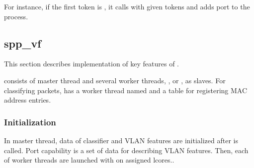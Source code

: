 \documentclass[a4paper,11pt,openany,oneside,english]{sphinxmanual}
\begin{document}
For instance, if the first token is , it calls  with
given tokens and adds port to the process.


\subsection{spp\_vf}
\label{\detokenize{design/impl/spp_vf:spp-vf}}\label{\detokenize{design/impl/spp_vf:spp-vf-explain-spp-vf}}\label{\detokenize{design/impl/spp_vf::doc}}
This section describes implementation of key features of .

 consists of master thread and several worker threads,
,  or , as slaves.
For classifying packets,  has a worker thread named 
and a table for registering MAC address entries.


\subsubsection{Initialization}
\label{\detokenize{design/impl/spp_vf:initialization}}
In master thread, data of classifier and VLAN features are initialized
after  is called.
Port capability is a set of data for describing VLAN features.
Then, each of worker threads are launched with 
on assigned lcores..

\begin{sphinxVerbatim}[commandchars=\\\{\},formatcom=\footnotesize]

    


    
 
          
\end{sphinxVerbatim}
\end{document}
